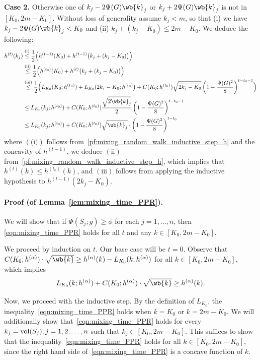 	\textbf{Case 2.} Otherwise one of $k_j - 2 \Psi(G) \wb{k}_j$ or $k_j + 2 \Psi(G) \wb{k}_j$ is not in $[K_0,2m  - K_0]$. Without loss of generality assume $k_j < m$, so that (i) we have $k_j - 2 \Psi(G) \wb{k}_j < K_0$ and (ii) $k_j + (k_j - K_0) \leq 2m - K_0$. We deduce the following:
	\begin{align*}
	h^{(t)}(k_j) & \overset{(\textrm{i})}{\leq} \frac{1}{2}\Bigl(h^{(t - 1)}(K_0) + h^{(t - 1)}\bigl(k_j + (k_j - K_0)\bigr)\Bigr) \\
	& \overset{(\textrm{ii})}{\leq} \frac{1}{2}\Bigl(h^{(t_0)}(K_0) + h^{(t)}\bigl(k_j + (k_j - K_0)\bigr)\Bigr) \\
	& \overset{(\textrm{iii})}{\leq}\frac{1}{2}\Bigl(L_{K_0}(K_0;h^{(t_0)}) + L_{K_0}(2k_j - K_0; h^{(t_0)}\bigr) + C(K_0;h^{(t_0)})\sqrt{\overline{2k_j - K_0}}\left(1 - \frac{\Psi(G)^2}{8}\right)^{t - t_0 - 1}\Bigr) \\
	& \leq L_{K_0}(k_j; h^{(t_0)}) + C(K_0;h^{(t_0)}) \frac{\sqrt{2\wb{k}_j}}{2} \left(1 - \frac{\Psi(G)^2}{8}\right)^{t - t_0 - 1} \\
	& \leq L_{K_0}(k_j;h^{(t_0)}) + C(K_0;h^{(t_0)}) \sqrt{\wb{k}_j} \cdot \left(1 - \frac{\Psi(G)^2}{8}\right)^{t - t_0}
	\end{align*}
	where $(\textrm{(i)})$ follows from~\eqref{pf:mixing_random_walk_inductive_step_h} and the concavity of $h^{(t - 1)}$,  we deduce $(\textrm{ii})$ from~\eqref{pf:mixing_random_walk_inductive_step_h}, which implies that $h^{(t)}(k) \leq h^{(t_0)}(k)$, and $(\textrm{iii})$ follows from applying the inductive hypothesis to $h^{(t - 1)}(2k_j - K_0)$. 	

\paragraph{Proof (of Lemma~\ref{lem:mixing_time_PPR}).}
	We will show that if $\Phi(S_j; g) \geq \phi$ for each $j = 1,\ldots,n$, then \eqref{eqn:mixing_time_PPR} holds for all $t$ and any $k \in [K_0,2m - K_0]$.
	
	We proceed by induction on $t$. Our base case will be $t = 0$. Observe that $C(K_0;h^{(\alpha)}) \cdot \sqrt{\wb{k}} \geq h^{(\alpha)}(k) - L_{K_0}(k;h^{(\alpha)})$ for all $k \in [K_0,2m - K_0]$, which implies
	\begin{equation*}
	L_{K_0}(k;h^{(\alpha)}) + C(K_0;h^{(\alpha)}) \cdot \sqrt{\wb{k}} \geq h^{(\alpha)}(k).
	\end{equation*}
	
	Now, we proceed with the inductive step. By the definition of $L_{K_0}$, the inequality~\eqref{eqn:mixing_time_PPR} holds when $k = K_0$ or $k = 2m - K_0$. We will additionally show that~\eqref{eqn:mixing_time_PPR} holds for every $k_j = \mathrm{vol}(S_j), j = 1,2,\ldots,n$ such that $k_j \in [K_0, 2m - K_0]$. This suffices to show that the inequality~\eqref{eqn:mixing_time_PPR} holds for all $k \in [K_0,2m - K_0]$, since the right hand side of~\eqref{eqn:mixing_time_PPR} is a concave function of $k$.
	
